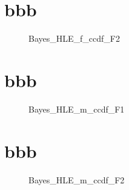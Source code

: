 \documentclass[a4j,11pt,mc]{jreport}
\begin{document}
\section{bbb}
\begin{figure}[h!]
	\begin{center}
			\caption{Bayes\_HLE\_f\_ccdf\_F2}
	\end{center}
\end{figure}


\section{bbb}
\begin{figure}[h!]
	\begin{center}
			\caption{Bayes\_HLE\_m\_ccdf\_F1}
	\end{center}
\end{figure}


\section{bbb}
\begin{figure}[h!]
	\begin{center}
			\caption{Bayes\_HLE\_m\_ccdf\_F2}
	\end{center}
\end{figure}
\end{document}
